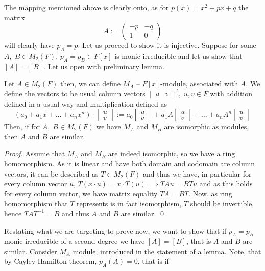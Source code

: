\documentclass[8pt]{article} %
\begin{document}
\begin{enumerate}[label=\bfseries Problem \arabic*.]
{\begin{enumerate}[label=(\arabic*).]
{				The mapping mentioned above is clearly onto, as for $p(x)=x^2+px+q$ the matrix
				\[A:=\begin{pmatrix}-p&-q\\1&0\end{pmatrix}\]will clearly have $p_A=p$. Let us proceed to show
				it is injective. Suppose for some $A,\;B\in M_2(F)$, $p_A=p_B\in F[x]$
				is monic irreducible and let us show that $[A]=[B]$. Let us open with preliminary lemma.
				\begin{lemma}Let $A\in M_2(F)$ then, we can define $M_A$ -- $F[x]$-module, associated with $A$. We define
					the vectors to be usual column vectors $\begin{bmatrix}u&v\end{bmatrix}^t,\;u,v\in F$ with addition defined
					in a usual way and multiplication defined as
					\[(a_0+a_1x+\dots+a_nx^n)\cdot\begin{bmatrix}u\\v\end{bmatrix}:=a_0\begin{bmatrix}u\\v\end{bmatrix}+
						a_1A\begin{bmatrix}u\\v\end{bmatrix}+\dots+a_nA^n\begin{bmatrix}u\\v\end{bmatrix}\]
					Then, if for $A,\;B\in M_2(F)$ we have $M_A$ and $M_B$ are isomorphic as modules, then $A$ and $B$ are similar.
					\end{lemma}
				\begin{proof}Assume that $M_A$ and $M_B$ are indeed isomorphic, so we have a ring homomorphism. As it is linear and have
					both domain and codomain are column vectors, it can be described as $T\in M_2(F)$ and thus we have, in particular for every
					column vector $u$, $T(x\cdot u)=x\cdot T(u)\implies TAu=BTu$ and as this holds for every column vector, we have
					matrix equality $TA=BT$. Now, as ring homomorphism that $T$ represents is in fact isomorphism, $T$ should be invertible, hence
					$TAT^{-1}=B$ and thus $A$ and $B$ are similar.
				\qed\end{proof}
				Restating what we are targeting to prove now, we want to show that if $p_A=p_B$ monic irreducible of a second degree
				we have $[A]=[B]$, that is $A$ and $B$ are similar.
				Consider $M_A$ module, introduced in the statement of a lemma. Note, that by Cayley-Hamilton theorem, $p_A(A)=0$, that is if
}
\end{enumerate}}
\end{enumerate}
\end{document}
